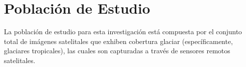 \section{Población de Estudio}
\label{sec:PoblacionEstudio}

La población de estudio para esta investigación está compuesta por el conjunto total de imágenes satelitales que exhiben cobertura glaciar (específicamente, glaciares tropicales), las cuales son capturadas a través de sensores remotos satelitales.